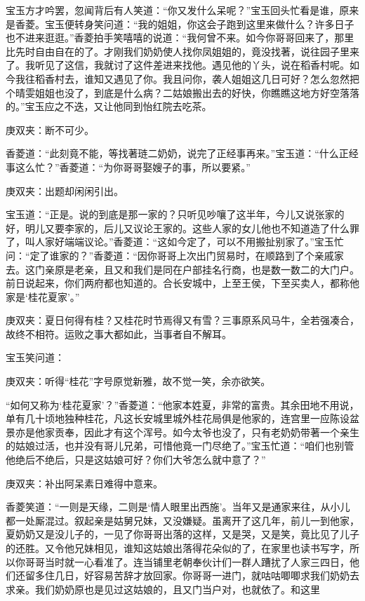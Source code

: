 \begin{parag}
    宝玉方才吟罢，忽闻背后有人笑道：“你又发什么呆呢？”宝玉回头忙看是谁，原来是香菱。宝玉便转身笑问道：“我的姐姐，你这会子跑到这里来做什么？许多日子也不进来逛逛。”香菱拍手笑嘻嘻的说道：“我何曾不来。如今你哥哥回来了，那里比先时自由自在的了。才刚我们奶奶使人找你凤姐姐的，竟没找著，说往园子里来了。我听见了这信，我就讨了这件差进来找他。遇见他的丫头，说在稻香村呢。如今我往稻香村去，谁知又遇见了你。我且问你，袭人姐姐这几日可好？怎么忽然把个晴雯姐姐也没了，到底是什么病？二姑娘搬出去的好快，你瞧瞧这地方好空落落的。”宝玉应之不迭，又让他同到怡红院去吃茶。\begin{note}庚双夹：断不可少。\end{note}香菱道：“此刻竟不能，等找著琏二奶奶，说完了正经事再来。”宝玉道：“什么正经事这么忙？”香菱道：“为你哥哥娶嫂子的事，所以要紧。”\begin{note}庚双夹：出题却闲闲引出。\end{note}宝玉道：“正是。说的到底是那一家的？只听见吵嚷了这半年，今儿又说张家的好，明儿又要李家的，后儿又议论王家的。这些人家的女儿他也不知道造了什么罪了，叫人家好端端议论。”香菱道：“这如今定了，可以不用搬扯别家了。”宝玉忙问：“定了谁家的？”香菱道：“因你哥哥上次出门贸易时，在顺路到了个亲戚家去。这门亲原是老亲，且又和我们是同在户部挂名行商，也是数一数二的大门户。前日说起来，你们两府都也知道的。合长安城中，上至王侯，下至买卖人，都称他家是‘桂花夏家’。”\begin{note}庚双夹：夏日何得有桂？又桂花时节焉得又有雪？三事原系风马牛，全若强凑合，故终不相符。运败之事大都如此，当事者自不解耳。\end{note}宝玉笑问道：\begin{note}庚双夹：听得“桂花”字号原觉新雅，故不觉一笑，余亦欲笑。\end{note}“如何又称为‘桂花夏家’？”香菱道：“他家本姓夏，非常的富贵。其余田地不用说，单有几十顷地独种桂花，凡这长安城里城外桂花局俱是他家的，连宫里一应陈设盆景亦是他家贡奉，因此才有这个浑号。如今太爷也没了，只有老奶奶带著一个亲生的姑娘过活，也并没有哥儿兄弟，可惜他竟一门尽绝了。”宝玉忙道：“咱们也别管他绝后不绝后，只是这姑娘可好？你们大爷怎么就中意了？”\begin{note}庚双夹：补出阿呆素日难得中意来。\end{note}香菱笑道：“一则是天缘，二则是‘情人眼里出西施’。当年又是通家来往，从小儿都一处厮混过。叙起亲是姑舅兄妹，又没嫌疑。虽离开了这几年，前儿一到他家，夏奶奶又是没儿子的，一见了你哥哥出落的这样，又是哭，又是笑，竟比见了儿子的还胜。又令他兄妹相见，谁知这姑娘出落得花朵似的了，在家里也读书写字，所以你哥哥当时就一心看准了。连当铺里老朝奉伙计们一群人蹧扰了人家三四日，他们还留多住几日，好容易苦辞才放回家。你哥哥一进门，就咕咕唧唧求我们奶奶去求亲。我们奶奶原也是见过这姑娘的，且又门当户对，也就依了。和这里
\end{parag}
